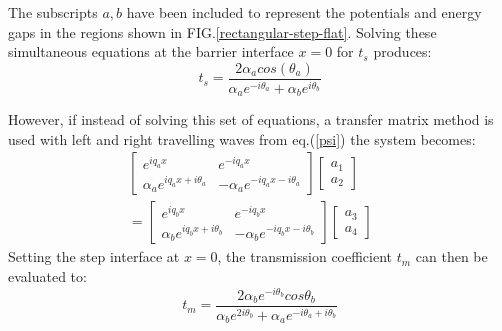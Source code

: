 \documentclass[prl,twocolumn,aps,superscriptaddress,floatfix,10pt]{revtex4}
\begin{document}
	The subscripts $a,b$ have been included to represent the potentials and energy gaps in the regions shown in FIG.\ref{rectangular-step-flat}. Solving these simultaneous equations at the barrier interface $x=0$ for $t_{s}$ produces:
\begin{equation}
	t_{s}=\frac{2\alpha_{a}cos\left(\theta_{a}\right)}{\alpha_{a}e^{-i\theta_{a}}+\alpha_{b}e^{i\theta_{b}}}
\end{equation}

	However, if instead of solving this set of equations, a transfer matrix method is used \cite{b18} with left and right travelling waves from eq.(\ref{psi}) the system becomes:
		\begin{align}
			\left[\begin{array}{ccc}
				e^{iq_{a}x}&e^{-iq_{a}x}\\
				\alpha_{a}e^{iq_{a}x+i\theta_{a}}&-\alpha_{a}e^{-iq_{a}x-i\theta_{a}}
			\end{array}\right]
			\left[\begin{array}{ccc}
				a_{1}\\
				a_{2}
			\end{array}\right]
			\hspace{1cm}
			\\=
			\left[\begin{array}{ccc}
				e^{iq_{b}x}&e^{-iq_{b}x}\\
				\alpha_{b}e^{iq_{b}x+i\theta_{b}}&-\alpha_{b}e^{-iq_{b}x-i\theta_{b}}
			\end{array}\right]
			\left[\begin{array}{ccc}
				a_{3}\\
				a_{4}
			\end{array}\right]
		\end{align}
Setting the step interface at $x=0$, the transmission coefficient $t_{m}$ can then be evaluated to:
\begin{equation}
	t_{m}=\frac{2\alpha_{b}e^{-i\theta_{b}}cos\theta_{b}}{\alpha_{b}e^{2i\theta_{b}}+\alpha_{a}e^{-i\theta_{a}+i\theta_{b}}}
\end{equation}
\end{document}
